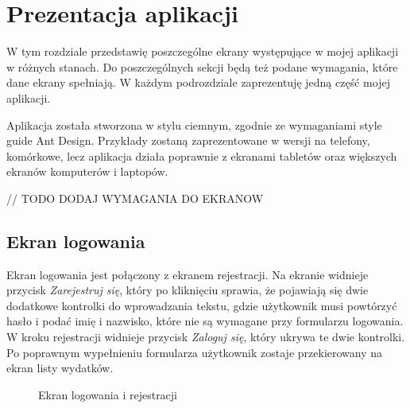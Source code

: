 \newpage
\section{Prezentacja aplikacji}
W tym rozdziale przedstawię poszczególne ekrany występujące w mojej aplikacji w różnych stanach. Do poszczególnych sekcji będą też podane wymagania, które dane ekrany spełniają. W każdym podrozdziale zaprezentuję jedną część mojej aplikacji. 

Aplikacja została stworzona w stylu ciemnym, zgodnie ze wymaganiami style guide Ant Design. Przykłady zostaną zaprezentowane w wersji na telefony, komórkowe, lecz aplikacja działa poprawnie z ekranami tabletów oraz większych ekranów komputerów i laptopów.


// TODO DODAJ WYMAGANIA DO EKRANOW
\subsection{Ekran logowania}
Ekran logowania jest połączony z ekranem rejestracji. Na ekranie widnieje przycisk \emph{Zarejestruj się}, który po kliknięciu sprawia, że pojawiają się dwie dodatkowe kontrolki do wprowadzania tekstu, gdzie użytkownik musi powtórzyć hasło i podać imię i nazwisko, które nie są wymagane przy formularzu logowania. W kroku rejestracji widnieje przycisk \emph{Zaloguj się}, który ukrywa te dwie kontrolki. Po poprawnym wypełnieniu formularza użytkownik zostaje przekierowany na ekran listy wydatków.


\begin{figure}[h!]%
    \centering
    \qquad
    \caption{Ekran logowania i rejestracji}%
    \label{fig:example}%
\end{figure}

